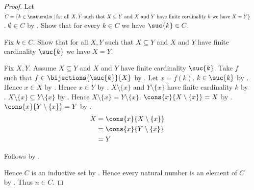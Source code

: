 \begin{proof}
    Let $C=\{k\in\naturals\mid
        \text{for all $X,Y$ such that $X\subseteq Y$ and
            $X$ and $Y$ have finite cardinality $k$ we have $X=Y$}\}$.
    $\emptyset\in C$ by
        .
    Show that for every $k\in C$ we have $\suc{k}\in C$.
    \begin{subproof}
        Fix $k\in C$.
        Show that for all $X,Y$ such that $X\subseteq Y$ and
            $X$ and $Y$ have finite cardinality $\suc{k}$ we have
            $X=Y$.
        \begin{subproof}
            Fix $X,Y$.
            Assume $X\subseteq Y$ and $X$ and $Y$ have finite cardinality
                $\suc{k}$.
            Take $f$ such that $f\in\bijections{\suc{k}}{X}$ by
                .
            Let $x=f(k)$.
            $k\in\suc{k}$ by .
            Hence $x\in X$ by
                .
            Hence $x\in Y$ by .
            $X\setminus\{x\}$ and $Y\setminus\{x\}$ have finite
                cardinality $k$ by
                .
            $X\setminus\{x\}\subseteq Y\setminus\{x\}$ by
                .
            Hence $X\setminus\{x\}=Y\setminus\{x\}$.
            $\cons{x}{X\setminus\{x\}}=X$ by .
            $\cons{x}{Y\setminus\{x\}}=Y$ by .
            \begin{align*}
                X
                    &= \cons{x}{X\setminus\{x\}}
                    \\
                    &= \cons{x}{Y\setminus\{x\}}
                    \\
                    &= Y
            \end{align*}
        \end{subproof}
        Follows by .
    \end{subproof}
    Hence $C$ is an inductive set by .
    Hence every natural number is an element of $C$ by
        .
    Thus $n\in C$.
\end{proof}


